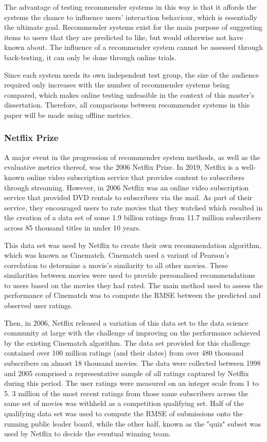 The advantage of testing recommender systems in this way is that it affords the systems the chance to influence users' interaction behaviour, which is essentially the ultimate goal. Recommender systems exist for the main purpose of suggesting items to users that they are predicted to like, but would otherwise not have known about. The influence of a recommender system cannot be assessed through back-testing, it can only be done through online trials. \parencite{handbook_1.4_neighbourhood}

Since each system needs its own independent test group, the size of the audience required only increases with the number of recommender systems being compared, which makes online testing unfeasible in the context of this master's dissertation. Therefore, all comparisons between recommender systems in this paper will be made using offline metrics.

\subsubsection{Netflix Prize}
A major event in the progression of recommender system methods, as well as the evaluative metrics thereof, was the 2006 Netflix Prize. In 2019, Netflix is a well-known online video subscription service that provides content to subscribers through streaming. However, in 2006 Netflix was an online video subscription service that provided DVD rentals to subscribers via the mail. As part of their service, they encouraged users to rate movies that they watched which resulted in the creation of a data set of some 1.9 billion ratings from 11.7 million subscribers across 85 thousand titles in under 10 years. \parencite{netflix_description}

This data set was used by Netflix to create their own recommendation algorithm, which was known as Cinematch. Cinematch used a variant of Pearson's correlation to determine a movie's similarity to all other movies. These similarities between movies were used to provide personalised recommendations to users based on the movies they had rated. The main method used to assess the performance of Cinematch was to compute the RMSE between the predicted and observed user ratings. \parencite{netflix_description}

Then, in 2006, Netflix released a variation of this data set to the data science community at large with the challenge of improving on the performance achieved by the existing Cinematch algorithm. The data set provided for this challenge contained over 100 million ratings (and their dates) from over 480 thousand subscribers on almost 18 thousand movies. The data were collected between 1998 and 2005 comprised a representative sample of all ratings captured by Netflix during this period. The user ratings were measured on an integer scale from 1 to 5. 3 million of the most recent ratings from those same subscribers across the same set of movies was withheld as a competition qualifying set. Half of the qualifying data set was used to compute the RMSE of submissions onto the running public leader board, while the other half, known as the "quiz" subset was used by Netflix to decide the eventual winning team. \parencite{netflix_description}

